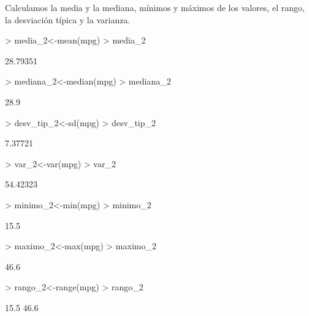 \documentclass[a4paper]{article}
\begin{document}
Calculamos la media y la mediana, mínimos y máximos de los valores, el rango, la desviación típica y la varianza.
\begin{Schunk}
\begin{Sinput}
> media_2<-mean(mpg)
> media_2
\end{Sinput}
\begin{Soutput}
[1] 28.79351
\end{Soutput}
\begin{Sinput}
> mediana_2<-median(mpg)
> mediana_2
\end{Sinput}
\begin{Soutput}
[1] 28.9
\end{Soutput}
\begin{Sinput}
> desv_tip_2<-sd(mpg)
> desv_tip_2
\end{Sinput}
\begin{Soutput}
[1] 7.37721
\end{Soutput}
\begin{Sinput}
> var_2<-var(mpg)
> var_2
\end{Sinput}
\begin{Soutput}
[1] 54.42323
\end{Soutput}
\begin{Sinput}
> minimo_2<-min(mpg)
> minimo_2
\end{Sinput}
\begin{Soutput}
[1] 15.5
\end{Soutput}
\begin{Sinput}
> maximo_2<-max(mpg)
> maximo_2
\end{Sinput}
\begin{Soutput}
[1] 46.6
\end{Soutput}
\begin{Sinput}
> rango_2<-range(mpg)
> rango_2
\end{Sinput}
\begin{Soutput}
[1] 15.5 46.6
\end{Soutput}
\end{Schunk}
\end{document}

